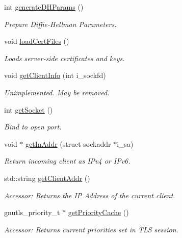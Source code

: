 \begin{DoxyCompactItemize}
int \hyperlink{classGTBCommunication_a22b23cdf3c160d540a1d5dddacf0efdf}{generate\-D\-H\-Params} ()
\begin{DoxyCompactList}\small\item\em Prepare Diffie-\/\-Hellman Parameters. \end{DoxyCompactList}\item 
void \hyperlink{classGTBCommunication_ae6c1cbc4736afe36731d442b72c181e4}{load\-Cert\-Files} ()
\begin{DoxyCompactList}\small\item\em Loads server-\/side certificates and keys. \end{DoxyCompactList}\item 
void \hyperlink{classGTBCommunication_a9603172b74add3207353ca4c49bb4290}{get\-Client\-Info} (int i\-\_\-sockfd)
\begin{DoxyCompactList}\small\item\em Unimplemented. May be removed. \end{DoxyCompactList}\item 
int \hyperlink{classGTBCommunication_a92ae038bbe4b05f7f17d9b9f59d6c158}{get\-Socket} ()
\begin{DoxyCompactList}\small\item\em Bind to open port. \end{DoxyCompactList}\item 
void $\ast$ \hyperlink{classGTBCommunication_a7d2a3e93ca5ba8a880fea467d2d8b325}{get\-In\-Addr} (struct sockaddr $\ast$i\-\_\-sa)
\begin{DoxyCompactList}\small\item\em Return incoming client as I\-Pv4 or I\-Pv6. \end{DoxyCompactList}\item 
std\-::string \hyperlink{classGTBCommunication_a0767f8f014450f4ba30d6be2db74086a}{get\-Client\-Addr} ()
\begin{DoxyCompactList}\small\item\em Accessor\-: Returns the I\-P Address of the current client. \end{DoxyCompactList}\item 
gnutls\-\_\-priority\-\_\-t $\ast$ \hyperlink{classGTBCommunication_ac40042c1dd24bb71f730eae70c0dfc06}{get\-Priority\-Cache} ()
\begin{DoxyCompactList}\small\item\em Accessor\-: Returns current priorities set in T\-L\-S session. \end{DoxyCompactList}\item 

\end{DoxyCompactItemize}
